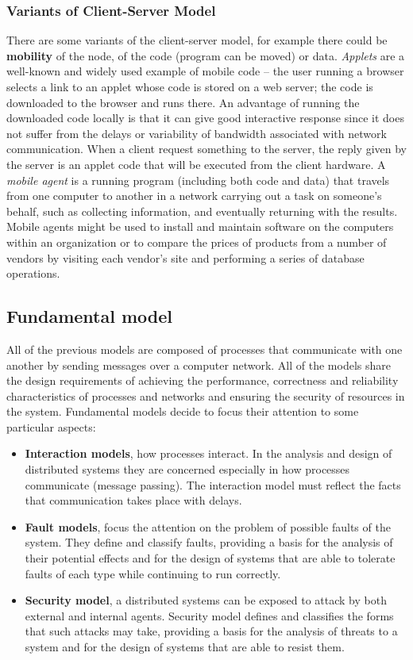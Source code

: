 \documentclass[11pt,a4paper]{article}
\begin{document}
\subsubsection{Variants of Client-Server Model}
There are some variants of the client-server model, for example there could be \textbf{mobility} of the node, of the code (program can be moved) or data.
\textit{Applets} are a well-known and widely used example of mobile code – the user running a browser selects a link to an applet whose code is stored on a web server; the code is downloaded to the browser and runs there. An advantage of running the downloaded code locally is that it can give good interactive response since it does not suffer from the delays or variability of bandwidth associated with network communication. When a client request something to the server, the reply given by the server is an applet code that will be executed from the client hardware.
A \textit{mobile agent} is a running program (including both code and data) that travels from one computer to another in a network carrying out a task on someone’s behalf, such as collecting information, and eventually returning with the results. Mobile agents might be used to install and maintain software on the computers within an organization or to compare the prices of products from a number of vendors by visiting each vendor’s site and performing a series of database operations.


\subsection{Fundamental model}
All of the previous models are composed of processes that communicate with one another by sending messages over a computer network. All of the models share the design requirements of achieving the performance, correctness and reliability characteristics of processes and networks and ensuring the security of resources in the system. Fundamental models decide to focus their attention to some particular aspects:
\begin{itemize}
	\item \textbf{Interaction models}, how processes interact. In the analysis and design of distributed systems they are concerned especially in how processes communicate (message passing). The interaction model must reflect the facts that communication takes place with delays.
	\item \textbf{Fault models}, focus the attention on the problem of possible faults of the system. They define and classify faults, providing a basis for the analysis of their potential effects and for the design of systems that are able to tolerate faults of each type while continuing to run correctly.
	\item \textbf{Security model}, a distributed systems can be exposed to attack by both external and internal agents. Security model defines and classifies the forms that such attacks may take, providing a basis for the analysis of threats to a system and for the design of systems that are able to resist them.
\end{itemize}
\end{document}
